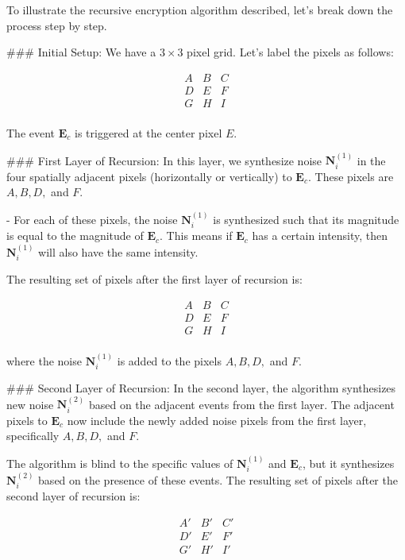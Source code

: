 To illustrate the recursive encryption algorithm described, let's break down the process step by step.

### Initial Setup:
We have a \(3 \times 3\) pixel grid. Let's label the pixels as follows:

\[
\begin{array}{ccc}
A & B & C \\
D & E & F \\
G & H & I \\
\end{array}
\]

The event \(\mathbf{E}_c\) is triggered at the center pixel \(E\).

### First Layer of Recursion:
In this layer, we synthesize noise \(\mathbf{N}^{(1)}_i\) in the four spatially adjacent pixels (horizontally or vertically) to \(\mathbf{E}_c\). These pixels are \(A, B, D,\) and \(F\).

- For each of these pixels, the noise \(\mathbf{N}^{(1)}_i\) is synthesized such that its magnitude is equal to the magnitude of \(\mathbf{E}_c\). This means if \(\mathbf{E}_c\) has a certain intensity, then \(\mathbf{N}^{(1)}_i\) will also have the same intensity.

The resulting set of pixels after the first layer of recursion is:

\[
\begin{array}{ccc}
A & B & C \\
D & E & F \\
G & H & I \\
\end{array}
\]

where the noise \(\mathbf{N}^{(1)}_i\) is added to the pixels \(A, B, D,\) and \(F\).

### Second Layer of Recursion:
In the second layer, the algorithm synthesizes new noise \(\mathbf{N}^{(2)}_i\) based on the adjacent events from the first layer. The adjacent pixels to \(\mathbf{E}_c\) now include the newly added noise pixels from the first layer, specifically \(A, B, D,\) and \(F\).

The algorithm is blind to the specific values of \(\mathbf{N}^{(1)}_i\) and \(\mathbf{E}_c\), but it synthesizes \(\mathbf{N}^{(2)}_i\) based on the presence of these events. The resulting set of pixels after the second layer of recursion is:

\[
\begin{array}{ccc}
A' & B' & C' \\
D' & E' & F' \\
G' & H' & I' \\
\end{array}
\]

